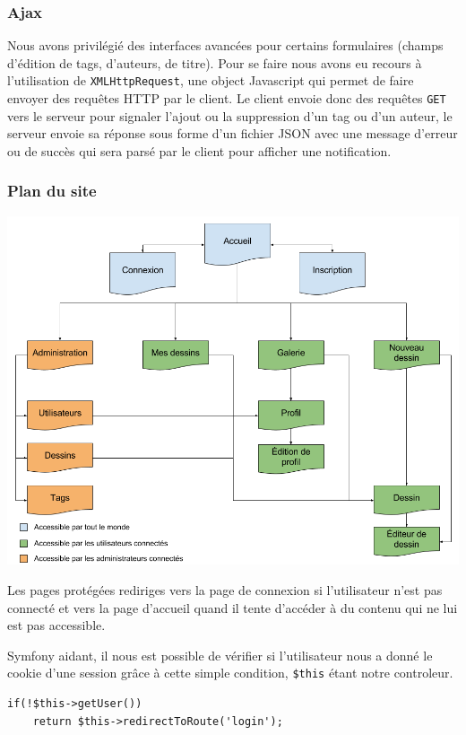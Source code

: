 \documentclass[a4paper]{article}
\begin{document}
\subsubsection{Ajax}

Nous avons privilégié des interfaces avancées pour certains formulaires (champs d'édition de tags, d'auteurs, de titre). Pour se faire nous avons eu recours à l'utilisation de \texttt{XMLHttpRequest}, une object Javascript qui permet de faire envoyer des requêtes HTTP par le client. Le client envoie donc des requêtes \texttt{GET} vers le serveur pour signaler l'ajout ou la suppression d'un tag ou d'un auteur, le serveur envoie sa réponse sous forme d'un fichier JSON avec une message d'erreur ou de succès qui sera parsé par le client pour afficher une notification.

\subsubsection{Plan du site}
\begin{center}
	\includegraphics[width=1\textwidth]{sketcher_sitemap.png}
\end{center}

Les pages protégées rediriges vers la page de connexion si l'utilisateur n'est pas connecté et vers la page d'accueil quand il tente d'accéder à du contenu qui ne lui est pas accessible.

Symfony aidant, il nous est possible de vérifier si l'utilisateur nous a donné le cookie d'une session grâce à cette simple condition, \texttt{\$this} étant notre controleur.
\begin{lstlisting}
if(!$this->getUser())
	return $this->redirectToRoute('login');
\end{lstlisting}
\end{document}
